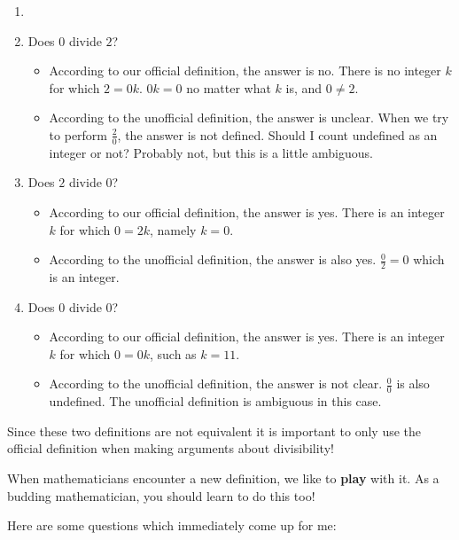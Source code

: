 \begin{solutions}
	\begin{enumerate}
				\item[]\mbox{}\\
		\item Does $0$ divide $2$?
		
		\begin{itemize}
			\item According to our official definition, the answer is no.  There is no integer $k$ for which $2 = 0k$.  $0k = 0$ no matter what $k$ is, and $0 \neq 2$.
			\item According to the unofficial definition, the answer is unclear.  When we try to perform $\frac{2}{0}$, the answer is not defined.  Should I count undefined as an integer or not?  Probably not, but this is a little ambiguous.
		\end{itemize}
		\item Does $2$ divide $0$? 
		
		\begin{itemize}
			\item According to our official definition, the answer is yes.  There is an integer $k$ for which $0 = 2k$, namely $k=0$.
			\item According to the unofficial definition, the answer is also yes.  $\frac{0}{2} = 0$ which is an integer.
		\end{itemize}
		\item Does $0$ divide $0$? 
		\begin{itemize}
			\item According to our official definition, the answer is yes.  There is an integer $k$ for which $0 = 0k$, such as $k=11$.
			\item According to the unofficial definition, the answer is not clear.  $\frac{0}{0}$ is also undefined.  The unofficial definition is ambiguous in this case.
		\end{itemize}
	\end{enumerate}
\end{solutions}

Since these two definitions are not equivalent it is important to only use the official definition when making arguments about divisibility!

When mathematicians encounter a new definition, we like to \textbf{play} with it.  As a budding mathematician, you should learn to do this too!

Here are some questions which immediately come up for me:

